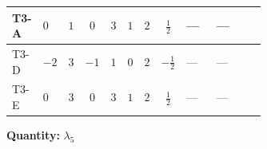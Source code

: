 \documentclass[8pt]{article}
\begin{document}
\begin{landscape}
\begin{longtable}{@{}llcccccc >{\raggedright\arraybackslash}p{0.21\linewidth} >{\raggedright\arraybackslash}p{0.21\linewidth} >{\raggedright\arraybackslash}p{0.21\linewidth}@{}}
\midrule
T3-A & $0$ & $1$ & $0$ & $3$ & $1$ & $2$ & $\frac{1}{2}$ & --- & --- & \scriptsize\adjustbox{max width=\linewidth}{$\begin{gathered} +2 {\lambda_{12}^{(1)}} {\lambda_5}\end{gathered}$} \\
\midrule
T3-D & $-2$ & $3$ & $-1$ & $1$ & $0$ & $2$ & $-\frac{1}{2}$ & --- & --- & \scriptsize\adjustbox{max width=\linewidth}{$\begin{gathered} +2 {\lambda_{12}^{(1)}} {\lambda_5}\end{gathered}$} \\
\midrule
T3-E & $0$ & $3$ & $0$ & $3$ & $1$ & $2$ & $\frac{1}{2}$ & --- & --- & \scriptsize\adjustbox{max width=\linewidth}{$\begin{gathered} +2 {\lambda_{12}^{(1)}} {\lambda_5}\end{gathered}$} \\
\midrule
\bottomrule
\end{longtable}
\clearpage
\noindent\textbf{Quantity: }$\lambda_5$\par\smallskip

\end{landscape}
\end{document}
